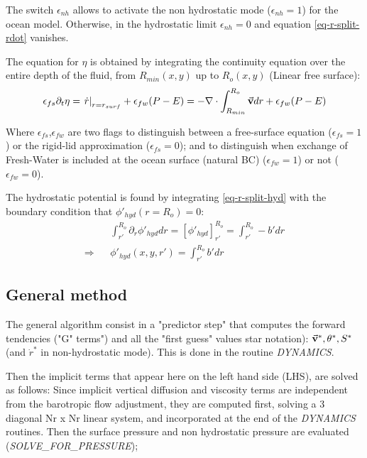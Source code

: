The switch $\epsilon_{nh}$ allows to activate the non hydrostatic
mode ($\epsilon_{nh}=1$) for the ocean model. Otherwise, 
in the hydrostatic limit $\epsilon_{nh} = 0$ 
and equation \ref{eq-r-split-rdot} vanishes.

The equation for $\eta$ is obtained by integrating the 
continuity equation over the entire depth of the fluid, 
from $R_{min}(x,y)$ up to $R_o(x,y)$ 
(Linear free surface):
\begin{eqnarray}
\epsilon_{fs} \partial_t \eta =
\left. \dot{r} \right|_{r=r_{surf}} + \epsilon_{fw} (P-E) =
- {\bf \nabla} \cdot \int_{R_{min}}^{R_o} \vec{\bf v} dr
+ \epsilon_{fw} (P-E)
\label{eq-cont-2D}
\end{eqnarray}

Where $\epsilon_{fs}$,$\epsilon_{fw}$ are two flags to 
distinguish between a free-surface equation ($\epsilon_{fs}=1$) 
or the rigid-lid approximation ($\epsilon_{fs}=0$);  
and to distinguish when exchange of Fresh-Water is included 
at the ocean surface (natural BC) ($\epsilon_{fw} = 1$) 
or not ($\epsilon_{fw} = 0$).

The hydrostatic potential is found by
integrating \ref{eq-r-split-hyd} with the boundary condition that
$\phi'_{hyd}(r=R_o) = 0$:
\begin{eqnarray*}
& &
\int_{r'}^{R_o} \partial_r \phi'_{hyd} dr =
\left[ \phi'_{hyd} \right]_{r'}^{R_o} =
\int_{r'}^{R_o} - b' dr
\\
\Rightarrow & &
\phi'_{hyd}(x,y,r') = \int_{r'}^{R_o} b' dr
\end{eqnarray*}

\subsection{General method}
 
The general algorithm consist in  a "predictor step" that computes
the forward tendencies ("G" terms") and all 
the "first guess" values star notation): 
$\vec{\bf v}^*, \theta^*, S^*$ (and $\dot{r}^*$
in non-hydrostatic mode). This is done in the routine {\it DYNAMICS}.

Then the implicit terms that appear here on the left hand side (LHS),
are solved as follows:
Since implicit vertical diffusion and viscosity terms 
are independent from the barotropic flow adjustment,
they are computed first, solving a 3 diagonal Nr x Nr linear system, 
and incorporated at the end of the {\it DYNAMICS} routines.
Then the surface pressure and non hydrostatic pressure
are evaluated ({\it SOLVE\_FOR\_PRESSURE}); 

